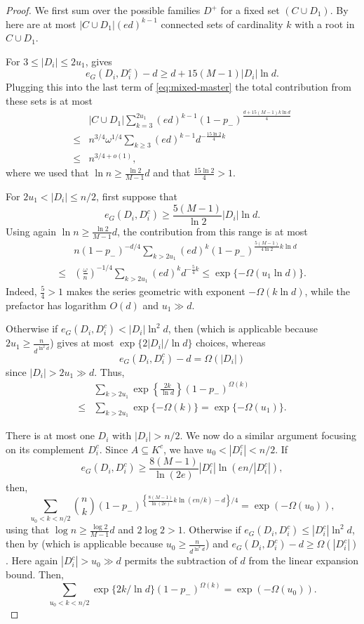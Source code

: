 \documentclass[10pt,a4paper]{amsart}
\begin{document}
\begin{proof}
We first sum over the possible families $D^+$ for a fixed set $(C \cup D_1)$.
By  here are at most $|C \cup D_1|(ed)^{k-1}$ connected sets of cardinality $k$ with a root in $C \cup D_1$.

For $3\le |D_i|\le2u_1$,  gives
\begin{equation*}\label{eq:component-small-boundary}
 e_G(D_i, D_i^c)-d \ge d+15(M-1)|D_i|\ln d.
\end{equation*}
Plugging this into the last term of \eqref{eq:mixed-master} the total contribution from these sets is at most
\begin{align*}
    &|C \cup D_1| \sum_{k=3}^{2u_1} (ed)^{k-1} (1-p_-)^{\frac{d+15(M-1)k \ln d}{4}}\\
    \leq & n^{3/4} \omega^{1/4} \sum_{k \geq 3} (ed)^{k-1} d^{-\frac{15 \ln 2}{4} k}\\
    \leq & n^{3/4+o(1)},
\end{align*}
where we used that $\ln n \geq \frac{\ln 2}{M-1} d$ and that $\frac{15 \ln 2}{4}>1$.

For $2u_1<|D_i|\le n/2$, first suppose that
\[
 e_G(D_i, D_i^c) \ge \frac{5(M-1)}{\ln 2}|D_i|\ln d.
\]
Using again $\ln n \geq \frac{\ln 2}{M-1}d$, the contribution from this range is at most
\begin{align*}
    &n (1-p_-)^{-d/4}\sum_{k>2u_1}(ed)^k (1-p_-)^{\frac{5(M-1)}{4 \ln 2} k \ln d}\\
    \leq & \left(\frac{\omega}{n} \right)^{-1/4} \sum_{k >2u_1} (ed)^k d^{-\frac{5}{4}k}
 \le\exp\{-\Omega(u_1\ln d)\}.
\end{align*}
Indeed, $\frac{5}{4}>1$ makes the series geometric with exponent $-\Omega(k\ln d)$, while the prefactor has logarithm $O(d)$ and $u_1\gg d$.

Otherwise if $e_G(D_i, D_i^c)<|D_i|\ln^2 d$, then  (which is applicable because $2u_1 \geq \frac{n}{d^{\ln^2 d}}$) gives at most $\exp\{2|D_i|/\ln d\}$ choices, whereas
\[
 e_G(D_i, D_i^c)-d = \Omega(|D_i|)
\]
since $|D_i|>2u_1 \gg d$. Thus,
\begin{align*}
    &\sum_{k > 2u_1} \exp\left\{ \frac{2k}{\ln d}\right\} (1-p_-)^{\Omega(k)}\\
    \leq & \sum_{k > 2u_1} \exp\{-\Omega(k)\} = \exp\{-\Omega(u_1)\}.
\end{align*}

There is at most one $D_i$ with $|D_i|>n/2$. We now do a similar argument focusing on its complement $D_i^c$. Since $A\subseteq K^c$, we have $u_0<|D_i^c|<n/2$.
If
\[
 e_G(D_i, D_i^c)\ge \frac{8(M-1)}{\ln(2e)}|D_i^c|\ln(en/|D_i^c|),
\]
then,
\[
 \sum_{u_0<k<n/2}\binom nk (1-p_-)^{\left\{\frac{8(M-1)}{\ln(2e)} k\ln(en/k)-d\right\}/4} =\exp(-\Omega(u_0)),
\]
using that $\log n \geq \frac{\log 2}{M-1} d$ and $2 \log 2>1$.
Otherwise if $e_G(D_i, D_i^c)\le |D_i^c|\ln^2d$, then by  (which is applicable because $u_0 \geq \frac{n}{d^{\ln^2 d}}$) and $e_G(D_i, D_i^c)-d\ge \Omega(|D_i^c|)$. Here again $|D_i^c|>u_0\gg d$ permits the subtraction of $d$ from the linear expansion bound. Then,
\[
\sum_{u_0<k<n/2}\exp\{2k/\ln d\}(1-p_-)^{\Omega(k)}=\exp(-\Omega(u_0)).
\]


\end{proof}
\end{document}
